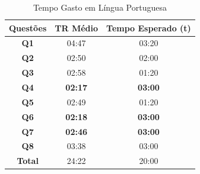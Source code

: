 \begin{table}[htbp]
\caption{Tempo Gasto em Língua Portuguesa}
\centering
\begin{tabular}{|c|c|c|}
\hline
\textbf{Questões} & \textbf{TR Médio} & \textbf{Tempo Esperado (t)} \\ \hline
\textbf{Q1} & 04:47 & 03:20 \\ \hline
\textbf{Q2} & 02:50 & 02:00 \\ \hline
\textbf{Q3} & 02:58 & 01:20 \\ \hline
\textbf{Q4} & \textbf{02:17} & \textbf{03:00} \\ \hline
\textbf{Q5} & 02:49 & 01:20 \\ \hline
\textbf{Q6} & \textbf{02:18} & \textbf{03:00} \\ \hline
\textbf{Q7} & \textbf{02:46} & \textbf{03:00} \\ \hline
\textbf{Q8} & 03:38 & 03:00 \\ \hline
\textbf{Total} & 24:22 & 20:00 \\ \hline
\end{tabular}
\label{tab:SRTPortuguese}
\end{table}


%

